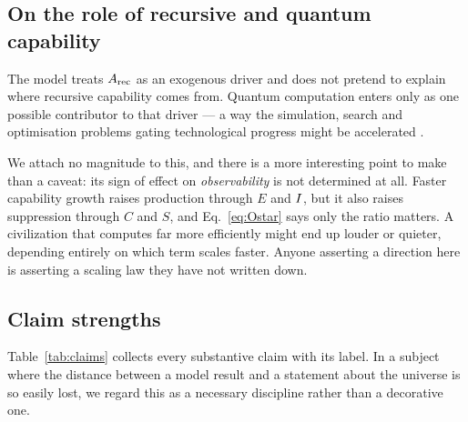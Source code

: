 \subsection{On the role of recursive and quantum capability}

The model treats $A_{\mathrm{rec}}$ as an exogenous driver and does not pretend to explain
where recursive capability comes from. Quantum computation enters only as one
possible contributor to that driver --- a way the simulation, search and
optimisation problems gating technological progress might be accelerated
\citep{shor1994,preskill2018}.

We attach no magnitude to this, and there is a more interesting point to make
than a caveat: its sign of effect on \emph{observability} is not determined at
all. Faster capability growth raises production through $E$ and $I$, but it
also raises suppression through $C$ and $S$, and Eq.~\eqref{eq:Ostar} says only
the ratio matters. A civilization that computes far more efficiently might end
up louder or quieter, depending entirely on which term scales faster. Anyone
asserting a direction here is asserting a scaling law they have not written
down. \Speculative

\subsection{Claim strengths}

Table~\ref{tab:claims} collects every substantive claim with its label. In a
subject where the distance between a model result and a statement about the
universe is so easily lost, we regard this as a necessary discipline rather than
a decorative one.

